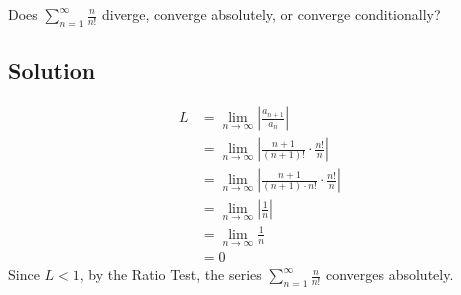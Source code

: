 \documentclass{article}
\begin{document}
\noindent
Does $\displaystyle \sum_{n=1}^\infty \frac{n}{n!}$
diverge, converge absolutely, or converge conditionally?

\subsection*{Solution}

\begin{align*}
L&=\lim_{n \to \infty} \left|\frac{a_{n+1}}{a_n}\right|\\
&= \lim_{n \to \infty} \left| \frac{n+1}{(n+1)!} \cdot\frac{n!}{n} \right|\\
&= \lim_{n \to \infty} \left| \frac{n+1}{(n+1) \cdot n!} \cdot\frac{n!}{n} \right|\\
&= \lim_{n \to \infty} \left| \frac1n \right|\\
&= \lim_{n \to \infty}  \frac1n \\
&= 0
\end{align*}
Since $L < 1$, by the Ratio Test, the series $\displaystyle \sum_{n=1}^\infty \frac{n}{n!}$ converges absolutely.
\end{document}
